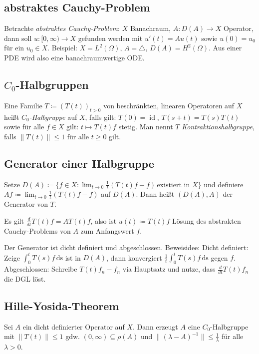 \documentclass[11pt,a4paper]{scrartcl}
\theoremstyle{plain}
\theoremstyle{definition}
\theoremstyle{remark}
\DeclareMathOperator{\id}{id}
\begin{document}
\subsection{abstraktes Cauchy-Problem}

Betrachte \emph{abstraktes Cauchy-Problem}: $X$ Banachraum, $A:D(A) \to X$ Operator, dann soll $u: [0,\infty) \to X$ gefunden werden mit $u'(t) = Au(t)$ sowie $u(0)=u_0$ für ein $u_0\in X$. Beispiel: $X=L^2(\Omega)$, $A=\triangle$, $D(A)=H^2(\Omega)$. Aus einer PDE wird also eine banachraumwertige ODE.

\subsection{$C_0$-Halbgruppen}

Eine Familie $T\coloneqq (T(t))_{t>0}$ von beschränkten, linearen Operatoren auf $X$ heißt \emph{$C_0$-Halbgruppe} auf $X$, falls gilt: $T(0)=\id$, $T(s+t)=T(s)T(t)$ sowie für alle $f\in X$ gilt: $t\mapsto T(t)f$ stetig. Man nennt $T$ \emph{Kontraktionshalbgruppe}, falls $\|T(t)\| \leq 1$ für alle $t\geq 0$ gilt.

\subsection{Generator einer Halbgruppe}

Setze $D(A)\coloneqq \{ f\in X: \lim_{t\to 0} \frac{1}{t}(T(t)f-f) \, \text{existiert in } X \}$ und definiere $Af \coloneqq \lim_{t\to 0} \frac{1}{t}(T(t)f-f)$ auf $D(A)$. Dann heißt $(D(A),A)$ der Generator von $T$.

Es gilt $\frac{d}{dt} T(t)f = AT(t)f$, also ist $u(t)\coloneqq T(t)f$ Lösung des abstrakten Cauchy-Problems von $A$ zum Anfangswert $f$.

Der Generator ist dicht definiert und abgeschlossen. Beweisidee: Dicht definiert: Zeige $\int_0^t T(s)f \, \mathrm{ds}$ ist in $D(A)$, dann konvergiert $\frac{1}{t} \int_0^t T(s)f \, \mathrm{ds}$ gegen $f$. Abgeschlossen: Schreibe $T(t)f_n-f_n$ via Hauptsatz und nutze, dass $\frac{d}{dt} T(t)f_n$ die DGL löst.

\subsection{Hille-Yosida-Theorem}

Sei $A$ ein dicht definierter Operator auf $X$. Dann erzeugt $A$ eine $C_0$-Halbgruppe mit $\|T(t)\| \leq 1$ gdw. $(0,\infty) \subseteq \rho(A)$ und $\|(\lambda-A)^{-1}\| \leq \frac{1}{\lambda}$ für alle $\lambda > 0$. 
\end{document}
